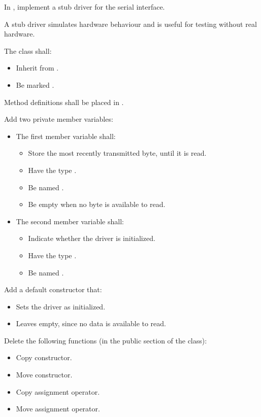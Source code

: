 \label{c3:set:2}

\label{c3:ex:2.1}
In , implement a stub driver  for the
serial interface.

A stub driver simulates hardware behaviour and is useful for testing without real hardware.

The class shall:
\begin{itemize}
  \item Inherit from .
  \item Be marked .
\end{itemize}
Method definitions shall be placed in .

Add two private member variables:
\begin{itemize}
  \item The first member variable shall:
  \begin{itemize}
    \item Store the most recently transmitted byte, until it is read.
    \item Have the type .
    \item Be named .
    \item Be empty when no byte is available to read.
  \end{itemize}
  \item The second member variable shall:
  \begin{itemize}
    \item Indicate whether the driver is initialized.
    \item Have the type .
    \item Be named .
  \end{itemize}
\end{itemize}

Add a default constructor that:
\begin{itemize}
  \item Sets the driver as initialized.
  \item Leaves  empty, since no data is available to read.
\end{itemize}

Delete the following functions (in the public section of the class):
\begin{itemize}
  \item Copy constructor.
  \item Move constructor.
  \item Copy assignment operator.
  \item Move assignment operator.
\end{itemize}

